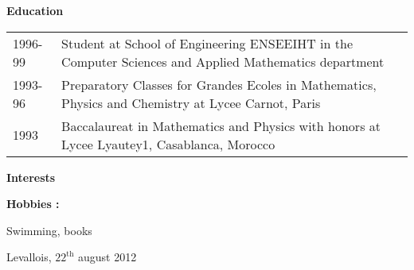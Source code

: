 \documentclass[a4paper,11pt]{letter}
\begin{document}
\textbf{Education}

\begin{tabular}{p{}p{}}
1996-99     & Student at School of Engineering ENSEEIHT in the Computer Sciences and Applied Mathematics department \\
1993-96     &  Preparatory Classes for Grandes Ecoles in Mathematics, Physics and Chemistry at Lycee Carnot, Paris \\
1993     &  Baccalaureat in Mathematics and Physics with honors at Lycee Lyautey1, Casablanca, Morocco \\
\end{tabular}

\textbf{Interests}

\textbf{Hobbies :}

Swimming, books

Levallois, $22^\mathrm{th}$ august 2012
\end{document}
